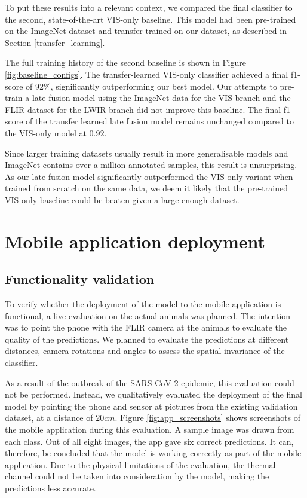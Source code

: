 \documentclass{l4proj}
\begin{document}
To put these results into a relevant context, we compared the final classifier to the second, state-of-the-art VIS-only baseline. This model had been pre-trained on the ImageNet dataset and transfer-trained on our dataset, as described in Section \ref{transfer_learning}.

The full training history of the second baseline is shown in Figure \ref{fig:baseline_configs}. The transfer-learned VIS-only classifier achieved a final f1-score of $92\%$, significantly outperforming our best model. Our attempts to pre-train a late fusion model using the ImageNet data for the VIS branch and the FLIR dataset for the LWIR branch did not improve this baseline. The final f1-score of the transfer learned late fusion model remains unchanged compared to the VIS-only model at $0.92$.

Since larger training datasets usually result in more generalisable models and ImageNet contains over a million annotated samples, this result is unsurprising. As our late fusion model significantly outperformed the VIS-only variant when trained from scratch on the same data, we deem it likely that the pre-trained VIS-only baseline could be beaten given a large enough dataset.



\section{Mobile application deployment}

\subsection{Functionality validation}

To verify whether the deployment of the model to the mobile application is functional, a live evaluation on the actual animals was planned. The intention was to point the phone with the FLIR camera at the animals to evaluate the quality of the predictions. We planned to evaluate the predictions at different distances, camera rotations and angles to assess the spatial invariance of the classifier. 

As a result of the outbreak of the SARS-CoV-2 epidemic, this evaluation could not be performed. Instead, we qualitatively evaluated the deployment of the final model by pointing the phone and sensor at pictures from the existing validation dataset, at a distance of $20 cm$. Figure \ref{fig:app_screenshots} shows screenshots of the mobile application during this evaluation. A sample image was drawn from each class. Out of all eight images, the app gave six correct predictions. It can, therefore, be concluded that the model is working correctly as part of the mobile application. Due to the physical limitations of the evaluation, the thermal channel could not be taken into consideration by the model, making the predictions less accurate.
\end{document}
